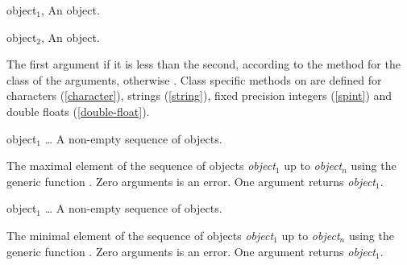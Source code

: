 \begin{optDefinition}
%
\begin{genericargs}
    \item[object$_1$, \classref{object}] An object.
    \item[object$_2$, \classref{object}] An object.
\end{genericargs}
%
\result%
The first argument if it is less than the second, according to the method for
the class of the arguments, otherwise \nil{}.
%
\seealso%
Class specific methods on  are defined for characters
(\ref{character}), strings (\ref{string}), fixed precision integers
(\ref{spint}) and double floats (\ref{double-float}).

%
\begin{arguments}
    \item[object$_1$ \ldots] A non-empty sequence of objects.
\end{arguments}
%
\result%
The maximal element of the sequence of objects {\em object$_1$} up to {\em
    object$_n$} using the generic function .  Zero arguments
is an error.  One argument returns {\em object$_1$}.

%
\begin{arguments}
    \item[object$_1$ \ldots] A non-empty sequence of objects.
\end{arguments}
%
\result%
The minimal element of the sequence of objects {\em object$_1$} up to {\em
    object$_n$} using the generic function .  Zero arguments
is an error.  One argument returns {\em object$_1$}.
%
\end{optDefinition}
